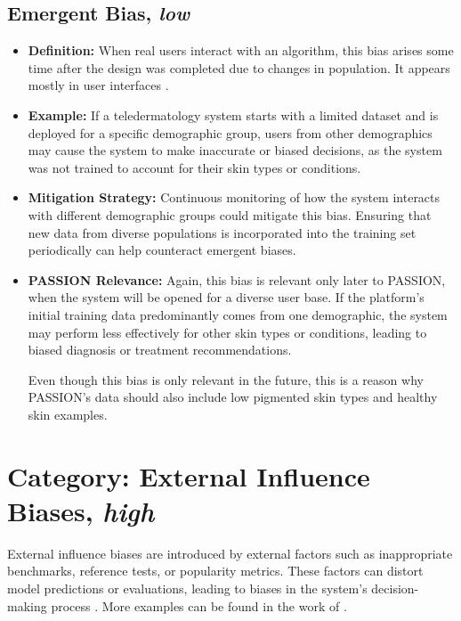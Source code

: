 \documentclass[12pt, a4paper, oneside]{book}   	%
\begin{document}
\begin{appendices}
		\subsection{Emergent Bias, \textit{low}}
		\begin{itemize}
			\item \textbf{Definition:} When real users interact with an algorithm, this bias arises some time after the design was completed due to changes in population. It appears mostly in user interfaces \autocite{M53_Friedman_1996}.
			\item \textbf{Example:} If a \gls{teledermatology} system starts with a limited dataset and is deployed for a specific demographic group, users from other demographics may cause the system to make inaccurate or biased decisions, as the system was not trained to account for their skin types or conditions.
			\item \textbf{Mitigation Strategy:} Continuous monitoring of how the system interacts with different demographic groups could mitigate this bias. Ensuring that new data from diverse populations is incorporated into the training set periodically can help counteract emergent biases.
			\item \textbf{PASSION Relevance:} Again, this bias is relevant only later to PASSION, when the system will be opened for a diverse user base. If the platform's initial training data predominantly comes from one demographic, the system may perform less effectively for other skin types or conditions, leading to biased diagnosis or treatment recommendations.
			
			Even though this bias is only relevant in the future, this is a reason why PASSION's data should also include low pigmented skin types and healthy skin examples.
		\end{itemize}
		
		\section{Category: External Influence Biases, \textit{high}} \label{app:biasCategoryExternalInfluenceBiasesHigh}
		External influence biases are introduced by external factors such as inappropriate benchmarks, reference tests, or popularity metrics. These factors can distort model predictions or evaluations, leading to biases in the system's decision-making process \autocite{Mehrabi_2021}. More examples can be found in the work of \textcite{Young_2020}.
		

\end{appendices}
\end{document}
